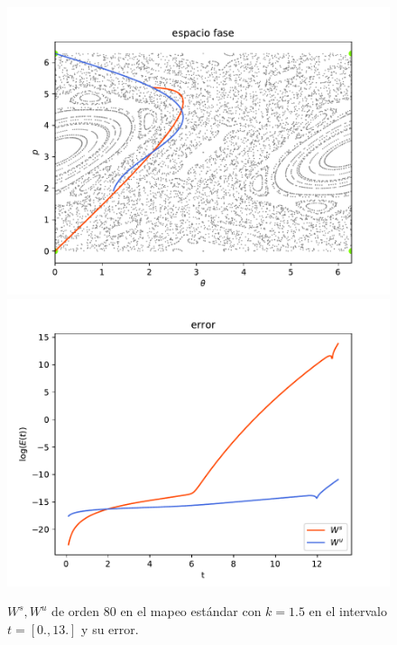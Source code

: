 \documentclass[11pt]{beamer}
\theoremstyle{definition}
\begin{document}
\begin{frame}
\begin{figure}[H]
	\centering
	\includegraphics[scale=0.35]{k15}
	\includegraphics[scale=0.35]{errork15}
	\caption{$W^{s},W^{u}$ de orden $80$ en el mapeo estándar con $k=1.5$ en el intervalo $t=[0.,13.]$ y su error.}
	\label{estandar15}
\end{figure}
\end{frame}
\end{document}
